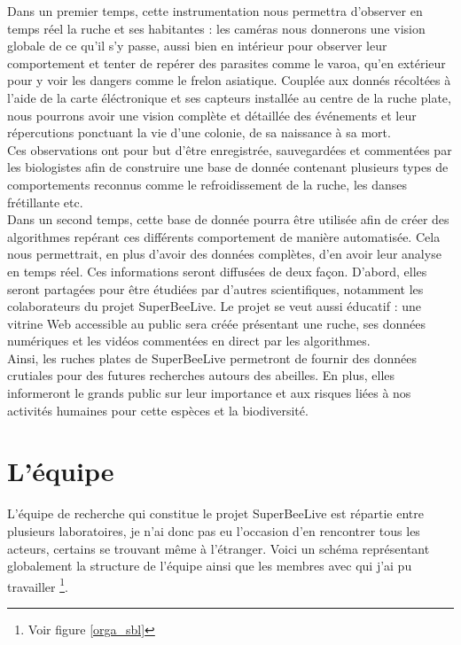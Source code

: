 \documentclass[11pt,french,a4paper]{report}
\begin{document}
Dans un premier temps, cette instrumentation nous permettra d'observer en temps réel la ruche et ses habitantes : 
les caméras nous donnerons une vision globale de ce qu'il s'y passe, aussi bien en intérieur pour observer leur 
comportement et tenter de repérer des parasites comme le varoa, qu'en extérieur pour y voir les dangers comme le frelon asiatique. %
Couplée aux donnés récoltées à l'aide de la carte éléctronique et ses capteurs installée au centre de la ruche plate, 
nous pourrons avoir une vision complète et détaillée des événements et leur répercutions ponctuant la vie d'une colonie,
de sa naissance à sa mort. \\
Ces observations ont pour but d'être enregistrée, sauvegardées et commentées par les biologistes afin de construire une base
de donnée contenant plusieurs types de comportements reconnus comme le refroidissement de la ruche, les danses frétillante etc. %
\\
Dans un second temps, cette base de donnée pourra être utilisée afin de créer des algorithmes repérant ces différents comportement
de manière automatisée. Cela nous permettrait, en plus d'avoir des données complètes, d'en avoir leur analyse en 
temps réel. Ces informations seront diffusées de deux façon. D'abord, elles seront partagées pour être étudiées par d'autres scientifiques, 
notamment les colaborateurs du projet SuperBeeLive. Le projet se veut aussi éducatif : une vitrine Web accessible au public 
sera créée présentant une ruche, ses données numériques et les vidéos commentées en direct par les algorithmes. \\


Ainsi, les ruches plates de SuperBeeLive permetront de fournir des données crutiales pour des futures recherches autours des 
abeilles. En plus, elles informeront le grands public sur leur importance et aux risques liées à nos activités humaines pour 
cette espèces et la biodiversité. 


\section{L'équipe}
L'équipe de recherche qui constitue le projet SuperBeeLive est répartie entre plusieurs laboratoires, je n'ai donc pas eu l'occasion
d'en rencontrer tous les acteurs, certains se trouvant même à l'étranger. Voici un schéma représentant globalement la structure
de l'équipe ainsi que les membres avec qui j'ai pu travailler \footnote{ Voir figure \ref{orga_sbl} }. \\
\end{document}
